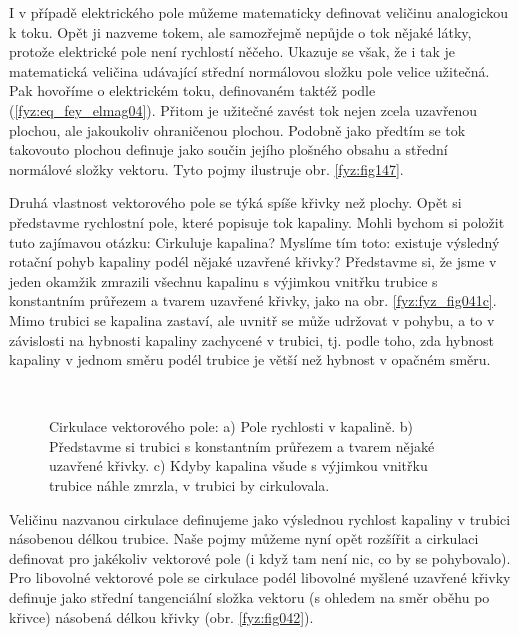 
    I v případě elektrického pole můžeme matematicky definovat veličinu analogickou k toku. Opět ji
    nazveme tokem, ale samozřejmě nepůjde o tok nějaké látky, protože elektrické pole není rychlostí
    něčeho. Ukazuje se však, že i tak je matematická veličina udávající střední normálovou složku
    pole velice užitečná. Pak hovoříme o elektrickém toku, definovaném taktéž podle
    (\ref{fyz:eq_fey_elmag04}). Přitom je užitečné zavést tok nejen zcela uzavřenou plochou, ale
    jakoukoliv ohraničenou plochou. Podobně jako předtím se tok takovouto plochou definuje jako
    součin jejího plošného obsahu a střední normálové složky vektoru. Tyto pojmy ilustruje obr.
    \ref{fyz:fig147}. 
    
    Druhá vlastnost vektorového pole se týká spíše křivky než plochy. Opět si představme rychlostní 
    pole, které popisuje tok kapaliny. Mohli bychom si položit tuto zajímavou otázku: Cirkuluje 
    kapalina? Myslíme tím toto: existuje výsledný rotační pohyb kapaliny podél nějaké uzavřené 
    křivky? Představme si, že jsme v jeden okamžik zmrazili všechnu kapalinu s výjimkou vnitřku 
    trubice s konstantním průřezem a tvarem uzavřené křivky, jako na obr. \ref{fyz:fyz_fig041c}. 
    Mimo trubici se kapalina zastaví, ale uvnitř se může udržovat v pohybu, a to v závislosti na 
    hybnosti kapaliny zachycené v trubici, tj. podle toho, zda hybnost kapaliny v jednom směru 
    podél trubice je větší než hybnost v opačném směru.  

    \begin{figure}[ht!]
      \centering
        \\
      \caption{Cirkulace vektorového pole: a) Pole rychlosti v kapalině. b) Představme si trubici s
               konstantním průřezem a tvarem nějaké uzavřené křivky. c) Kdyby kapalina všude s
               výjimkou vnitřku trubice náhle zmrzla, v trubici by cirkulovala.
               \cite[s.~18]{Feynman02}}
      \label{fyz:fig041}
    \end{figure}    

    Veličinu nazvanou cirkulace definujeme jako výslednou rychlost kapaliny v trubici násobenou 
    délkou trubice. Naše pojmy můžeme nyní opět rozšířit a cirkulaci definovat pro jakékoliv 
    vektorové pole (i když tam není nic, co by se pohybovalo). Pro libovolné vektorové pole se 
    cirkulace podél libovolné myšlené uzavřené křivky definuje jako střední tangenciální složka 
    vektoru (s ohledem na směr oběhu po křivce) násobená délkou křivky (obr. \ref{fyz:fig042}). 

